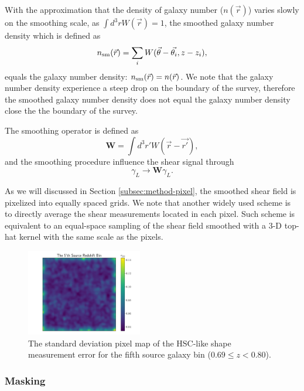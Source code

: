 \documentclass[twocolumn]{aastex62}
\begin{document}
With the approximation that the density of galaxy number ($n(\vec{r})$) varies slowly on the smoothing scale,
as $\int d^3r W(\vec{r})=1$, the smoothed galaxy number density which is defined as
\begin{equation}\label{eq-numDesSmooth}
n_{\rm{sm}}(\vec{r})=\sum_i W(\vec{\theta}-\vec{\theta_i},z-z_i),
\end{equation}
equals the galaxy number density: $n_{\rm{sm}}(\vec{r})=n(\vec{r})$.
We note that the galaxy number density experience a steep drop on the boundary of the survey, therefore the
smoothed galaxy number density does not equal the galaxy number density close the the boundary of the survey.

The smoothing operator is defined as
\begin{equation}
\mathbf{W} = \int d^3 r' W(\vec{r}-\vec{r'}),
\end{equation}
and the smoothing procedure influence the shear signal through
\begin{equation}
\gamma_L \rightarrow \mathbf{W} \gamma_L.
\end{equation}

As we will discussed in Section \ref{subsec:method-pixel}, the smoothed shear field is pixelized into equally spaced
grids. We note that another widely used scheme is to directly average the shear measurements located in each pixel.
Such scheme is equivalent to an equal-space sampling of the shear field smoothed with a $3$-D top-hat kernel with the
same scale as the pixels.

\begin{figure}[!t]
 \centering
 \includegraphics[width=0.45\textwidth]{noise_std_map_pix.pdf}
 \caption{The standard deviation pixel map of the HSC-like shape measurement error for the fifth source galaxy bin 
        ($0.69 \leq z < 0.80 $).
        } \label{fig-noistdmap}
\end{figure}

\subsubsection{Masking}
\label{subsec:method-msknoise}
\end{document}

